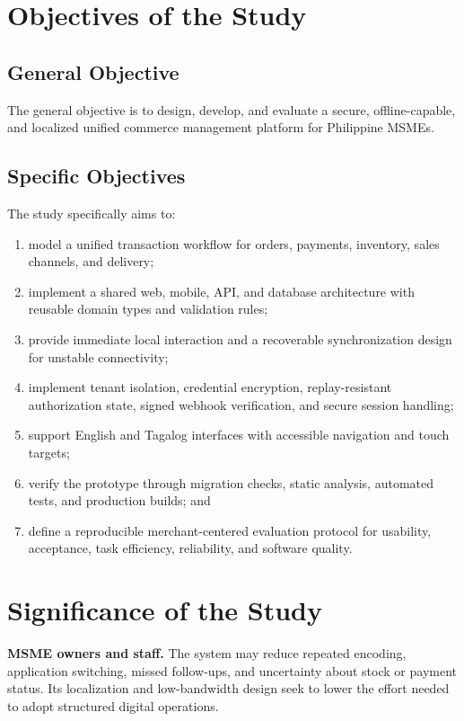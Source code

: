 \documentclass[12pt,oneside]{report}
\begin{document}
\section{Objectives of the Study}
\subsection{General Objective}
The general objective is to design, develop, and evaluate a secure,
offline-capable, and localized unified commerce management platform for
Philippine MSMEs.

\subsection{Specific Objectives}
The study specifically aims to:

\begin{enumerate}
  \item model a unified transaction workflow for orders, payments, inventory,
  sales channels, and delivery;
  \item implement a shared web, mobile, API, and database architecture with
  reusable domain types and validation rules;
  \item provide immediate local interaction and a recoverable synchronization
  design for unstable connectivity;
  \item implement tenant isolation, credential encryption, replay-resistant
  authorization state, signed webhook verification, and secure session
  handling;
  \item support English and Tagalog interfaces with accessible navigation and
  touch targets;
  \item verify the prototype through migration checks, static analysis,
  automated tests, and production builds; and
  \item define a reproducible merchant-centered evaluation protocol for
  usability, acceptance, task efficiency, reliability, and software quality.
\end{enumerate}

\section{Significance of the Study}
\textbf{MSME owners and staff.} The system may reduce repeated encoding,
application switching, missed follow-ups, and uncertainty about stock or payment
status. Its localization and low-bandwidth design seek to lower the effort
needed to adopt structured digital operations.
\end{document}

